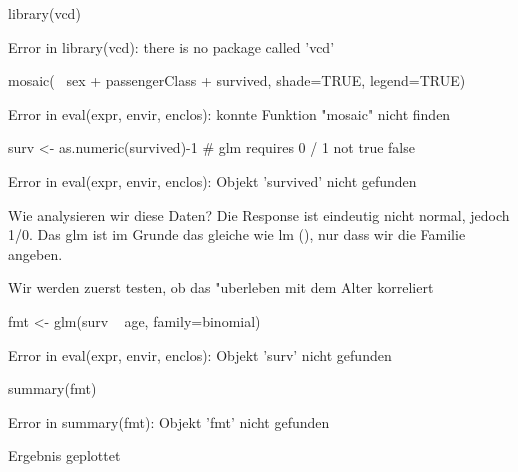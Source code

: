 \documentclass[a4paper,twoside]{tufte-book}\usepackage[]{graphicx}\usepackage[]{color}
\begin{document}
\begin{appendices}
\begin{Schunk}
\begin{Sinput}
library(vcd)
\end{Sinput}
\begin{Soutput}
Error in library(vcd): there is no package called 'vcd'
\end{Soutput}
\begin{Sinput}
mosaic(~ sex + passengerClass + survived, shade=TRUE, legend=TRUE) 
\end{Sinput}
\begin{Soutput}
Error in eval(expr, envir, enclos): konnte Funktion "mosaic" nicht finden
\end{Soutput}
\begin{Sinput}
surv <- as.numeric(survived)-1 # glm requires 0 / 1 not true false
\end{Sinput}
\begin{Soutput}
Error in eval(expr, envir, enclos): Objekt 'survived' nicht gefunden
\end{Soutput}
\end{Schunk}

Wie analysieren wir diese Daten? Die Response ist eindeutig nicht normal, jedoch 1/0. Das glm ist im Grunde das gleiche wie lm (), nur dass wir die Familie angeben.

Wir werden zuerst testen, ob das "uberleben mit dem Alter korreliert

\begin{Schunk}
\begin{Sinput}
fmt <- glm(surv ~ age, family=binomial)
\end{Sinput}
\begin{Soutput}
Error in eval(expr, envir, enclos): Objekt 'surv' nicht gefunden
\end{Soutput}
\begin{Sinput}
summary(fmt)
\end{Sinput}
\begin{Soutput}
Error in summary(fmt): Objekt 'fmt' nicht gefunden
\end{Soutput}
\end{Schunk}

Ergebnis geplottet


\end{appendices}
\end{document}
